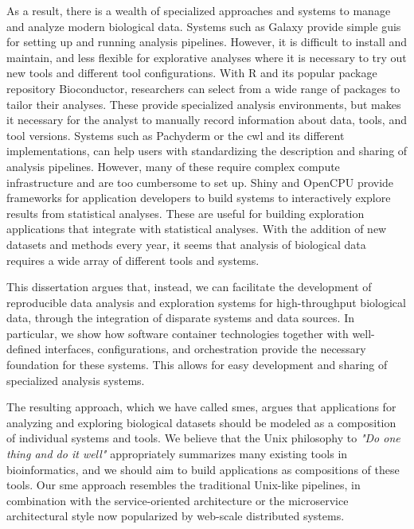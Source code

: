 As a result, there is a wealth of specialized approaches and systems to manage
and analyze modern biological data. Systems such as Galaxy\cite{galaxy} provide
simple \glspl{gui} for setting up and running analysis pipelines. However, it is
difficult to install and maintain, and less flexible for explorative analyses
where it is necessary to try out new tools and different tool
configurations.\cite{spjuth2015experiences} With R and its popular package
repository Bioconductor,\cite{bioconductor} researchers can select from a wide
range of packages to tailor their analyses. These provide specialized analysis
environments, but makes it necessary for the analyst to manually record
information about data, tools, and tool versions. Systems such as
Pachyderm\cite{pachyderm} or the \gls{cwl}\cite{commonwl} and its different
implementations, can help users with standardizing the description and sharing
of analysis pipelines.  However, many of these require complex compute
infrastructure and are too cumbersome to set up.  Shiny\cite{shiny} and
OpenCPU\cite{opencpu} provide frameworks for application developers to build
systems to interactively explore results from statistical analyses.  These are
useful for building exploration applications that integrate with statistical
analyses.  With the addition of new datasets and methods every year, it seems
that analysis of biological data requires a wide array of different tools and
systems.

This dissertation argues that, instead, we can facilitate the development of
reproducible data analysis and exploration systems for high-throughput
biological data, through the integration of disparate systems and data sources.
In particular, we show how software container technologies together with
well-defined interfaces, configurations, and orchestration provide the necessary
foundation for these systems. This allows for easy development and sharing of
specialized analysis systems.


The resulting approach, which we have called \glspl{sme}, argues that
applications for analyzing and exploring biological datasets should be modeled
as a composition of individual systems and tools. We believe that the Unix
philosophy to \emph{"Do one thing and do it well"}\cite{raymond2003art}
appropriately summarizes many existing tools in bioinformatics, and we should
aim to build applications as compositions of these tools. Our \gls{sme} approach
resembles the traditional Unix-like pipelines, in combination with the
service-oriented architecture\cite{erl2005service} or the microservice
architectural style now popularized by web-scale distributed
systems.\cite{nadareishvili2016microservice}

